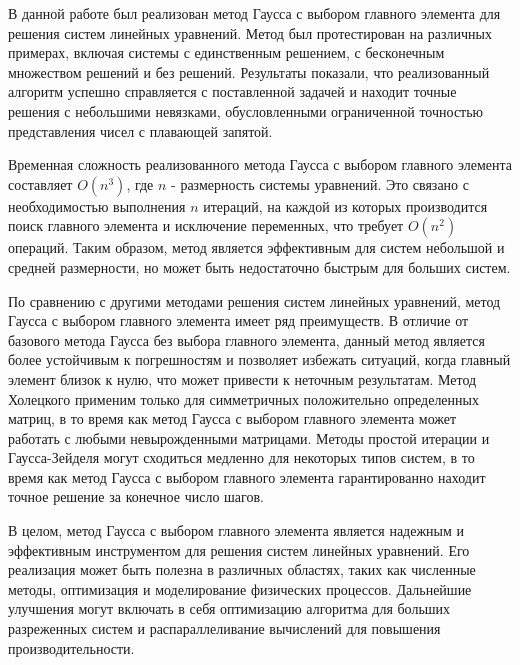 В данной работе был реализован метод Гаусса с выбором главного элемента для решения систем линейных уравнений. Метод был протестирован на различных примерах, включая системы с единственным решением, с бесконечным множеством решений и без решений. Результаты показали, что реализованный алгоритм успешно справляется с поставленной задачей и находит точные решения с небольшими невязками, обусловленными ограниченной точностью представления чисел с плавающей запятой.

Временная сложность реализованного метода Гаусса с выбором главного элемента составляет $O(n^3)$, где $n$ - размерность системы уравнений. Это связано с необходимостью выполнения $n$ итераций, на каждой из которых производится поиск главного элемента и исключение переменных, что требует $O(n^2)$ операций. Таким образом, метод является эффективным для систем небольшой и средней размерности, но может быть недостаточно быстрым для больших систем.

По сравнению с другими методами решения систем линейных уравнений, метод Гаусса с выбором главного элемента имеет ряд преимуществ. В отличие от базового метода Гаусса без выбора главного элемента, данный метод является более устойчивым к погрешностям и позволяет избежать ситуаций, когда главный элемент близок к нулю, что может привести к неточным результатам. Метод Холецкого применим только для симметричных положительно определенных матриц, в то время как метод Гаусса с выбором главного элемента может работать с любыми невырожденными матрицами. Методы простой итерации и Гаусса-Зейделя могут сходиться медленно для некоторых типов систем, в то время как метод Гаусса с выбором главного элемента гарантированно находит точное решение за конечное число шагов.

В целом, метод Гаусса с выбором главного элемента является надежным и эффективным инструментом для решения систем линейных уравнений. Его реализация может быть полезна в различных областях, таких как численные методы, оптимизация и моделирование физических процессов. Дальнейшие улучшения могут включать в себя оптимизацию алгоритма для больших разреженных систем и распараллеливание вычислений для повышения производительности.

